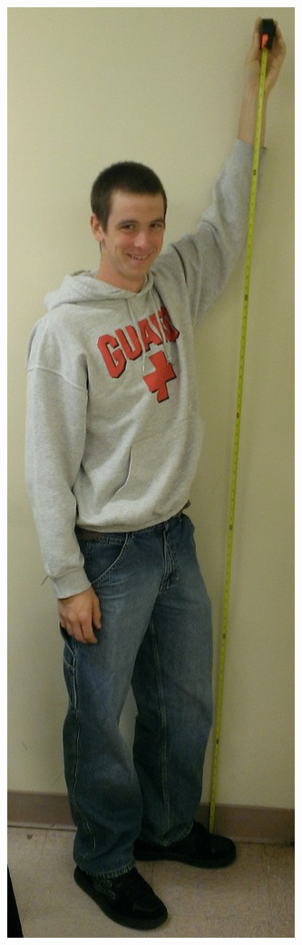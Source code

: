 \documentclass[pdftex,10.5pt]{report}
\begin{document}
\begin{figure}[H]
	\centering
	\begin{subfigure}[H]{0.4\textwidth}
		\includegraphics[width=\textwidth]{figures/ryanmeasure}

\end{subfigure}
\end{figure}
\end{document}
